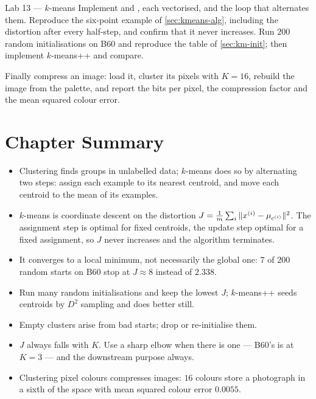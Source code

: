 \begin{labbox}{Lab 13 --- $k$-means}
Implement  and , each
vectorised, and the loop that alternates them. Reproduce the six-point example of
\cref{sec:kmeans-alg}, including the distortion after every half-step, and
confirm that it never increases. Run $200$ random initialisations on B60 and
reproduce the table of \cref{sec:km-init}; then implement $k$-means++ and compare.

Finally compress an image: load it, cluster its pixels with $K = 16$, rebuild the
image from the palette, and report the bits per pixel, the compression factor and
the mean squared colour error.
\end{labbox}

\section*{Chapter Summary}

\begin{itemize}
  \item Clustering finds groups in unlabelled data; $k$-means does so by
        alternating two steps: assign each example to its nearest centroid, and
        move each centroid to the mean of its examples.
  \item $k$-means is coordinate descent on the distortion
        $J = \frac1m\sum_i\|x^{(i)} - \mu_{c^{(i)}}\|^2$. The assignment step is
        optimal for fixed centroids, the update step optimal for a fixed
        assignment, so $J$ never increases and the algorithm terminates.
  \item It converges to a local minimum, not necessarily the global one: $7$ of
        $200$ random starts on B60 stop at $J \approx 8$ instead of $2.338$.
  \item Run many random initialisations and keep the lowest $J$; $k$-means++
        seeds centroids by $D^2$ sampling and does better still.
  \item Empty clusters arise from bad starts; drop or re-initialise them.
  \item $J$ always falls with $K$. Use a sharp elbow when there is one --- B60's
        is at $K = 3$ --- and the downstream purpose always.
  \item Clustering pixel colours compresses images: $16$ colours store a
        photograph in a sixth of the space with mean squared colour error
        $0.0055$.
\end{itemize}

